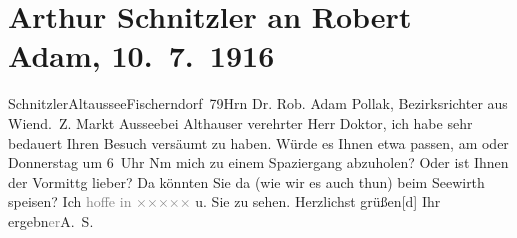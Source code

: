 

               \section[Arthur Schnitzler an Robert Adam, 10. 7. 1916]{ Arthur Schnitzler an Robert Adam, 10. 7. 1916}\nopagebreak{}\rehead{ }\begin{ledgroupsized}[t]{13cm}\normalsize\beginnumbering{} \toendnotes[C]{\smallbreak\pagebreak[2]} 
\toendnotes[C]{\smallbreak}\pstart{}{\pb}Schnitzler\pend{}\pstart{}Altaussee\pend{}\pstart{}Fischerndorf 79\pend{}{\bigskip}\pstart{}Hrn Dr. Rob. Adam Pollak, Bezirksrichter aus Wien\pend{}\pstart{}d. Z. Markt Aussee\pend{}\pstart{}bei Althauser\pend{}{\bigskip}\pstart
           \noindent{}{\pb}verehrter Herr Doktor, ich habe sehr bedauert Ihren Besuch
                    versäumt zu haben. Würde es Ihnen etwa passen, am \label{K_L02230_1v}\label{K_L02230_1h} oder Donnerstag um 6 Uhr Nm mich zu einem
                    Spaziergang abzuholen? Oder ist Ihnen der Vormittg lieber? Da könnten Sie da{\geminationn} (wie wir es auch thun) beim Seewirth speisen? Ich \textcolor{gray}{hoffe in }{ }\textcolor{gray}{×}\-\textcolor{gray}{×}\-\textcolor{gray}{×}\-\textcolor{gray}{×}\-\textcolor{gray}{×} u. Sie zu sehen. Herzlichst
                        grüßen{[}d{]} Ihr ergebn\textcolor{gray}{er}\spacefill\mbox{A. S.}\pend
           \endnumbering{}\end{ledgroupsized}  \newcommand{\dateiname}{L02230}\newcommand{\titel}{Arthur Schnitzler an Robert Adam, 10. 7. 1916}\newcommand{\editorInnen}{Martin Anton Müller und Gerd-Hermann Susen}
      
